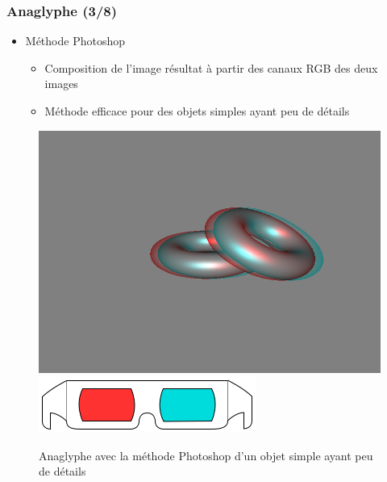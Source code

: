 \documentclass{beamer}
\begin{document}
%
\begin{frame}
\frametitle{Anaglyphe (3/8)}
\begin{itemize}[label=$\bullet$]
\item Méthode Photoshop \cite{stereoAnaglyph}
	\begin{itemize}[label=$\circ$]
	\item Composition de l'image résultat à partir des canaux RGB des deux images
	\item Méthode efficace pour des objets simples ayant peu de détails
	\end{itemize}
\end{itemize}
\begin{figure}
\centering
\includegraphics[scale=0.28]{donuts_photoshop.png}
\includegraphics[scale=0.2]{lunettes.png}
\caption{Anaglyphe avec la méthode Photoshop d'un objet simple ayant peu de détails }
\end{figure}


\end{frame}
\end{document}
